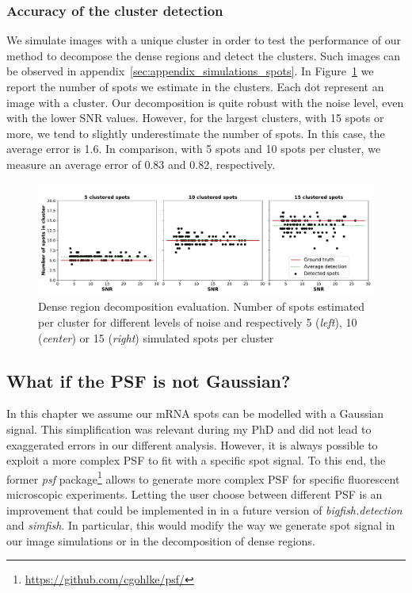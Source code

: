 \subsubsection{Accuracy of the cluster detection}

We simulate images with a unique cluster in order to test the performance of our method to decompose the dense regions and detect the clusters.
Such images can be observed in appendix~\ref{sec:appendix_simulations_spots}.
In Figure~\ref{fig:cluster_results} we report the number of spots we estimate in the clusters.
Each dot represent an image with a cluster.
Our decomposition is quite robust with the noise level, even with the lower \ac{SNR} values.
However, for the largest clusters, with 15 spots or more, we tend to slightly underestimate the number of spots.
In this case, the average error is 1.6.
In comparison, with 5 spots and 10 spots per cluster, we measure an average error of 0.83 and 0.82, respectively.

\begin{figure}[h]
    \centering
    \includegraphics[width=1\textwidth]{figures/chapter2/cluster_along_noise}
    \caption{Dense region decomposition evaluation.
	 Number of spots estimated per cluster for different levels of noise and respectively 5 (\textit{left}), 10 (\textit{center}) or 15 (\textit{right}) simulated spots per cluster}
    \label{fig:cluster_results}
\end{figure}

\subsection{What if the \ac{PSF} is not Gaussian?}
\label{subsec:psf}

In this chapter we assume our \ac{mRNA} spots can be modelled with a Gaussian signal.
This simplification was relevant during my PhD and did not lead to exaggerated errors in our different analysis.
However, it is always possible to exploit a more complex \ac{PSF} to fit with a specific spot signal.
To this end, the former \emph{psf} package\footnote{\url{https://github.com/cgohlke/psf/}} allows to generate more complex \ac{PSF} for specific fluorescent microscopic experiments.
Letting the user choose between different \ac{PSF} is an improvement that could be implemented in in a future version of \emph{bigfish.detection} and \emph{simfish}.
In particular, this would modify the way we generate spot signal in our image simulations or in the decomposition of dense regions.

